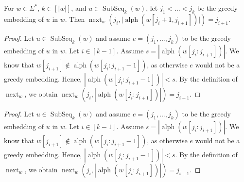 \documentclass[runningheads,UKenglish,cleveref, autoref, thm-restate]{llncs}
\DeclareMathOperator{\alphabet}{alph}
\DeclareMathOperator{\al}{alph}
\DeclareMathOperator\ScatFact{SubSeq}
\DeclareMathOperator{\nextAlphPos}{next}
\newif\ifpaper
\begin{document}
\begin{lemma}
    \label{lemma:next-function-property-scatfact-implies-sequence}
    For $w \in \Sigma^*$, $k \in [\vert w \vert]$, and $u \in \ScatFact_k(w)$, let $ j_1 < \dots < j_k $ be the greedy embedding of $u$ in $w$. Then $\nextAlphPos_w(j_i, \vert \alphabet(w[j_i + 1, j_{i + 1}]) \vert) = j_{i+1}$.
\end{lemma}
\ifpaper
\begin{proof}
	Let $u\in\ScatFact_k(w)$ and assume $e = (j_1,...,j_k)$ to be the greedy embedding of $u$ in $w$. Let $i\in[k-1]$. Assume $s = |\al(w[j_i : j_{i+1}])|$. We know that $w[j_{i+1}]\notin\al(w[j_i : j_{i+1}-1])$, as otherwise $e$ would not be a greedy embedding. Hence, $|\al(w[j_i : j_{i+1}-1])| < s$. By the definition of $\nextAlphPos_w$, we obtain $\nextAlphPos_w(j_i,|\al(w[j_i : j_{i+1}])|) = j_{i+1}$.
\end{proof}

\else
\begin{proof}
	Let $u\in\ScatFact_k(w)$ and assume $e = (j_1,...,j_k)$ to be the greedy embedding of $u$ in $w$. Let $i\in[k-1]$. Assume $s = |\al(w[j_i : j_{i+1}])|$. We know that $w[j_{i+1}]\notin\al(w[j_i : j_{i+1}-1])$, as otherwise $e$ would not be a greedy embedding. Hence, $|\al(w[j_i : j_{i+1}-1])| < s$. By the definition of $\nextAlphPos_w$, we obtain $\nextAlphPos_w(j_i,|\al(w[j_i : j_{i+1}])|) = j_{i+1}$.
\end{proof}
\end{document}
